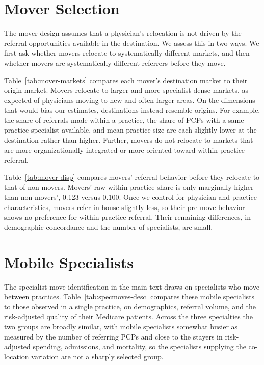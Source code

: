\documentclass[12pt]{article}
\begin{document}
\section{Mover Selection}
\label{sec:app-moverselect}

The mover design assumes that a physician's relocation is not driven by the referral opportunities available in the destination. We assess this in two ways. We first ask whether movers relocate to systematically different markets, and then whether movers are systematically different referrers before they move.

Table~\ref{tab:mover-markets} compares each mover's destination market to their origin market. Movers relocate to larger and more specialist-dense markets, as expected of physicians moving to new and often larger areas. On the dimensions that would bias our estimates, destinations instead resemble origins. For example, the share of referrals made within a practice, the share of PCPs with a same-practice specialist available, and mean practice size are each slightly lower at the destination rather than higher. Further, movers do not relocate to markets that are more organizationally integrated or more oriented toward within-practice referral.

Table~\ref{tab:mover-disp} compares movers' referral behavior before they relocate to that of non-movers. Movers' raw within-practice share is only marginally higher than non-movers', 0.123 versus 0.100. Once we control for physician and practice characteristics, movers refer in-house slightly less, so their pre-move behavior shows no preference for within-practice referral. Their remaining differences, in demographic concordance and the number of specialists, are small.


\section{Mobile Specialists}
\label{sec:specmoves-desc}

The specialist-move identification in the main text draws on specialists who move between practices. Table~\ref{tab:specmoves-desc} compares these mobile specialists to those observed in a single practice, on demographics, referral volume, and the risk-adjusted quality of their Medicare patients. Across the three specialties the two groups are broadly similar, with mobile specialists somewhat busier as measured by the number of referring PCPs and close to the stayers in risk-adjusted spending, admissions, and mortality, so the specialists supplying the co-location variation are not a sharply selected group.
\end{document}

